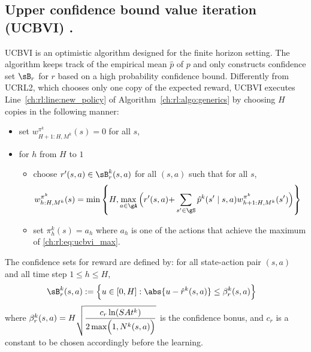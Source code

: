 \subsection{Upper confidence bound value iteration (UCBVI) \texorpdfstring{\cite{azar2017minimax}}{[AOM17]}.}
UCBVI is an optimistic algorithm designed for the finite horizon setting.
The algorithm keeps track of the empirical mean $\hat{p}$ of $p$ and only constructs confidence set $\sB_r$ for $r$ based on a high probability confidence bound.
Differently from UCRL2, which chooses only one copy of the expected reward, UCBVI executes Line~\ref{ch:rl:line:new_policy} of Algorithm~\ref{ch:rl:algo:generics} by choosing $H$ copies in the following manner:
\begin{itemize}
    \item set $w^{\pi^k}_{H+1:H,M^k}(s)=0$ for all $s$,
    \item for $h$ from $H$ to $1$
        \begin{itemize}
            \item choose $r'(s,a)\in\sB^k_r(s,a)$ for all $(s,a)$ such that for all $s$,
            \begin{align}
                w^{\pi^k}_{h:H,M^k}(s) &=\min\left\{H, \max_{a\in\gA}\Big(r'(s,a){+}\sum_{s'\in\gS}\hat{p}^k(s'\mid s,a)w_{h{+}1:H,M^k}^{\pi^k}(s')\Big)\right\} \label{ch:rl:eq:ucbvi_max}
            \end{align}
            \item set $\pi^k_h(s)=a_h$ where $a_h$ is one of the actions that achieve the maximum of \eqref{ch:rl:eq:ucbvi_max}.
        \end{itemize}
\end{itemize}
The confidence sets for reward are defined by: for all state-action pair $(s,a)$ and all time step $1\le h\le H$,
\begin{align*}
    \sB_r^k(s,a)&:=\Bigl\{u\in[0,H] : \abs{u-\hat{r}^k(s,a)}\le\beta^k_r(s,a)\Bigr\}
\end{align*}
where $\beta_r^k(s,a)=\displaystyle H\sqrt{\frac{c_r\ln(SAt^k)}{2\max\Bigl(1,N^k(s,a)\Bigr)}}$ is the confidence bonus, and $c_r$ is a constant to be chosen accordingly before the learning.

